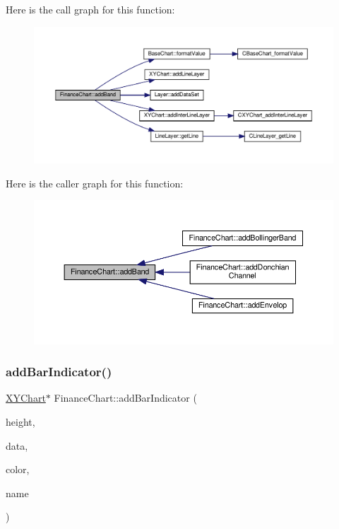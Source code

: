 Here is the call graph for this function\+:
\nopagebreak
\begin{figure}[H]
\begin{center}
\leavevmode
\includegraphics[width=350pt]{class_finance_chart_a821e548e8833d123ba447479959fbe7a_cgraph}
\end{center}
\end{figure}
Here is the caller graph for this function\+:
\nopagebreak
\begin{figure}[H]
\begin{center}
\leavevmode
\includegraphics[width=350pt]{class_finance_chart_a821e548e8833d123ba447479959fbe7a_icgraph}
\end{center}
\end{figure}
\mbox{\label{class_finance_chart_accbcf43fbdc88401416addefeaf06124}} 
\subsubsection{\texorpdfstring{add\+Bar\+Indicator()}{addBarIndicator()}}
{\footnotesize\ttfamily \hyperlink{class_x_y_chart}{X\+Y\+Chart}$\ast$ Finance\+Chart\+::add\+Bar\+Indicator (\begin{DoxyParamCaption}\item[{int}]{height,  }\item[{\hyperlink{class_double_array}{Double\+Array}}]{data,  }\item[{int}]{color,  }\item[{const char $\ast$}]{name }\end{DoxyParamCaption})\hspace{0.3cm}{\ttfamily [inline]}}



